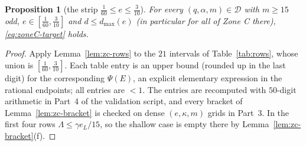 \documentclass[11pt]{article}
\newtheorem{proposition}[theorem]{Proposition}
\theoremstyle{remark}
\theoremstyle{plain}
\theoremstyle{plain}
\newcommand{\D}{\mathcal D}
\begin{document}
\begin{proposition}[the strip $\tfrac1{60}\le e\le\tfrac3{10}$]
\label{prop:strip}
For every $(q,\alpha,m)\in\D$ with $m\ge15$ odd,
$e\in[\tfrac1{60},\tfrac3{10}]$ and $d\le d_{\max}(e)$ (in particular for
all of Zone C there), \eqref{eq:zoneC-target} holds.
\end{proposition}

\begin{proof}
Apply Lemma~\ref{lem:zc-rows} to the $21$ intervals of
Table~\ref{tab:rows}, whose union is $[\tfrac1{60},\tfrac3{10}]$.  Each
table entry is an upper bound (rounded up in the last digit) for the
corresponding $\Psi(E)$, an explicit elementary expression in the rational
endpoints; all entries are $<1$.  The entries are recomputed with $50$-digit
arithmetic in Part~4 of the validation script, and every bracket of
Lemma~\ref{lem:zc-bracket} is checked on dense $(e,\kappa,m)$ grids in Part~3.
In the first four rows $\Lambda\le\gamma e_L/15$, so the shallow case is
empty there by Lemma~\ref{lem:zc-bracket}(f).
\end{proof}
\end{document}
